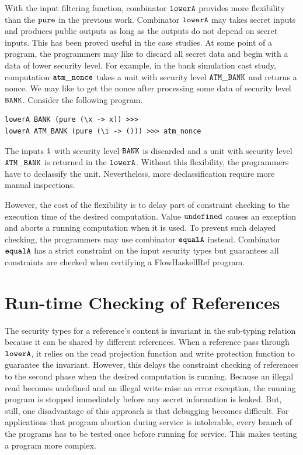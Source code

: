 \documentclass{report}
\newcommand{\co}[1]{$\cod{#1}$}
\begin{document}
With the input filtering function, combinator \co{lowerA} provides more flexibility than
the \co{pure} in the previous work. Combinator \co{lowerA} may takes secret inputs and produces
public outputs as long as the outputs do not depend on secret inputs. This has been proved
useful in the case studies. At some point of a program, the programmers may like to discard all
secret data and begin with a data of lower security level. 
For example, in the bank simulation cast study, computation
\co{atm\_nonce} takes a unit with security level \co{ATM\_BANK} and returns a nonce. 
We may like to get the nonce after processing some data of security level \co{BANK}.
Consider the following program.
\begin{Verbatim}[fontsize=\small]
lowerA BANK (pure (\x -> x)) >>>
lowerA ATM_BANK (pure (\i -> ())) >>> atm_nonce
\end{Verbatim}
The inputs \co{i} with security level \co{BANK} is discarded and a unit with security level 
\co{ATM\_BANK} is returned in the \co{lowerA}. Without this flexibility, the programmers have to
declassify the unit. Nevertheless, more declassification require more manual inspections.

However, the cost of the flexibility is to delay part of constraint checking to the execution time of
the desired computation. Value \co{undefined} causes an exception and aborts a running computation
when it is used. To prevent such delayed checking, the programmers may use combinator \co{equalA} instead.
Combinator \co{equalA} has a strict constraint on the input security types but guarantees all constraints
are checked when certifying a FlowHaskellRef program.

\section{Run-time Checking of References}
The security types for a reference's content is invariant in the sub-typing relation because 
it can be shared by different references.
When a reference pass through \co{lowerA}, it relies on the read projection function and
write protection function to guarantee the invariant.
However, this delays the constraint checking of references to the second phase when the
desired computation is running.
Because an illegal read becomes undefined and an illegal write raise an error exception,
the running program is stopped immediately before any secret information is leaked.
But, still, one disadvantage of this approach is that debugging becomes difficult. 
For applications that program abortion during service is intolerable, 
every branch of the programs has to be tested once before running for service. 
This makes testing a program more complex.
\end{document}
